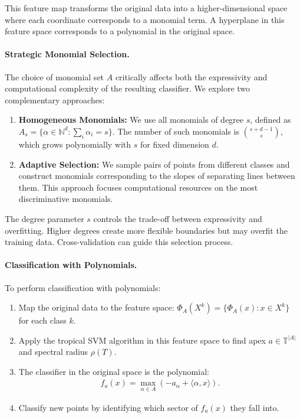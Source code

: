 \documentclass{article}
\newcommand{\trop}{\mathbb{T}}
\begin{document}
This feature map transforms the original data into a higher-dimensional space where each coordinate corresponds to a monomial term. A hyperplane in this feature space corresponds to a polynomial in the original space.

\paragraph{Strategic Monomial Selection.}
The choice of monomial set $A$ critically affects both the expressivity and computational complexity of the resulting classifier. We explore two complementary approaches:

\begin{enumerate}
    \item \textbf{Homogeneous Monomials:} We use all monomials of degree $s$, defined as 
    $A_s = \{\alpha \in \mathbb{N}^d : \sum_i \alpha_i = s\}$. The number of such monomials is $\binom{s+d-1}{s}$, which grows polynomially with $s$ for fixed dimension $d$.
    
    \item \textbf{Adaptive Selection:} We sample pairs of points from different classes and construct monomials corresponding to the slopes of separating lines between them. This approach focuses computational resources on the most discriminative monomials.
\end{enumerate}

The degree parameter $s$ controls the trade-off between expressivity and overfitting. Higher degrees create more flexible boundaries but may overfit the training data. Cross-validation can guide this selection process.

\paragraph{Classification with Polynomials.}\label{subsec:poly_classification}
To perform classification with polynomials:

\begin{enumerate}
    \item Map the original data to the feature space: $\Phi_A(X^k) = \{\Phi_A(x) : x \in X^k\}$ for each class $k$.
    
    \item Apply the tropical SVM algorithm in this feature space to find apex $a \in \trop^{|A|}$ and spectral radius $\rho(T)$.
    
    \item The classifier in the original space is the polynomial:
    \begin{align}
    f_a(x) = \max_{\alpha \in A} (-a_\alpha + \langle \alpha, x \rangle).
    \end{align}
    
    \item Classify new points by identifying which sector of $f_a(x)$ they fall into.
\end{enumerate}
\end{document}
